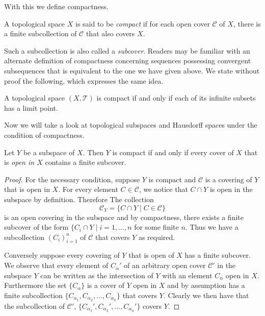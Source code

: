 With this we define compactness.

\begin{defn}
  A topological space $X$ is said to be \emph{compact} if for each
  open cover $\mathscr{C}$ of $X$, there is a finite subcollection of
  $\mathscr{C}$ that also covers $X$.
\end{defn}

Such a subcollection is also called a \emph{subcover}. Readers may be
familiar with an alternate definition of compactness concerning
sequences possessing convergent subsequences that is equivalent to the
one we have given above. We state without proof the following, which expresses the same idea.

\begin{thm}
  A topological space $(X, \mathscr{T})$ is compact if and only if
  each of its infinite subsets has a limit point.
\end{thm}

Now we will take a look at topological subspaces and Hausdorff spaces
under the condition of compactness.

\begin{lem}
  Let $Y$ be a subspace of $X$. Then $Y$ is compact if and only if
  every cover of $X$ that is \emph{open in $X$} contains a finite
  subcover.
\end{lem}

\begin{proof}
  For the necessary condition, suppose $Y$ is compact and
  $\mathscr{C}$ is a covering of $Y$ that is open in $X$. For every
  element $C \in \mathscr{C}$, we notice that $C \cap Y$ is open in
  the subspace by definition. Therefore The collection
  \[
    \mathscr{C}_Y = \{ C \cap Y \mid C \in \mathscr{C} \}
  \]
  is an open covering in the subspace and by compactness, there exists
  a finite subcover of the form $\{C_i \cap Y \mid i = 1, \dots,
  n$ for some finite $n$. Thus we have a subcollection $(C_i)_{i=1}^n$
  of $\mathscr{C}$ that covers $Y$ as required.

  Conversely suppose every covering of $Y$ that is open of $X$ has a
  finite subcover. We observe that every element of $C_\alpha'$ of an
  arbitrary open cover $\mathscr{C}'$ in the subspace $Y$ can be
  written as the intersection of $Y$ with an element $C_\alpha$ open
  in $X$. Furthermore the set $\{C_\alpha \}$ is a cover of $Y$ open
  in $X$ and by assumption has a finite subcollection $\{C_{\alpha_1},
  C_{\alpha_2}, \dots, C_{\alpha_n} \}$ that covers $Y$. Clearly we
  then have that the subcollection of $\mathscr{C}'$,
  $\{C_{\alpha_1}', C_{\alpha_2}', \dots, C_{\alpha_n}' \}$ covers
  $Y$. 
\end{proof}

